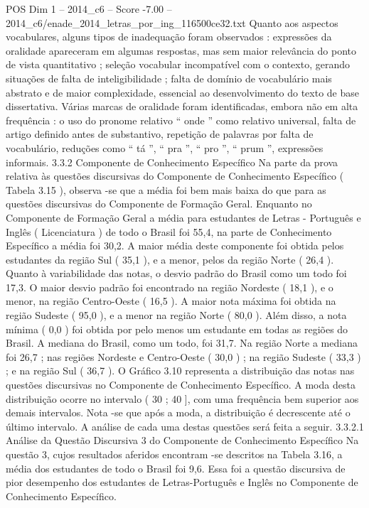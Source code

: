 \begin{textsample}{POS Dim 1 – 2014\_c6 – Score -7.00 – 2014\_c6/enade\_2014\_letras\_por\_ing\_116500ce32.txt}
Quanto aos aspectos vocabulares, alguns tipos de inadequação foram observados : expressões da oralidade apareceram em algumas respostas, mas sem maior relevância do ponto de vista quantitativo ; seleção vocabular incompatível com o contexto, gerando situações de falta de inteligibilidade ; falta de domínio de vocabulário mais abstrato e de maior complexidade, essencial ao desenvolvimento do texto de base dissertativa.
Várias marcas de oralidade foram identificadas, embora não em alta frequência : o uso do pronome relativo “ onde ” como relativo universal, falta de artigo definido antes de substantivo, repetição de palavras por falta de vocabulário, reduções como “ tá ”, “ pra ”, “ pro ”, “ prum ”, expressões informais. 3.3.2 Componente de Conhecimento Específico Na parte da prova relativa às questões discursivas do Componente de Conhecimento Específico ( Tabela 3.15 ), observa -se que a média foi bem mais baixa do que para as questões discursivas do Componente de Formação Geral.
Enquanto no Componente de Formação Geral a média para estudantes de Letras - Português e Inglês ( Licenciatura ) de todo o Brasil foi 55,4, na parte de Conhecimento Específico a média foi 30,2.
A maior média deste componente foi obtida pelos estudantes da região Sul ( 35,1 ), e a menor, pelos da região Norte ( 26,4 ).
Quanto à variabilidade das notas, o desvio padrão do Brasil como um todo foi 17,3.
O maior desvio padrão foi encontrado na região Nordeste ( 18,1 ), e o menor, na região Centro-Oeste ( 16,5 ).
A maior nota máxima foi obtida na região Sudeste ( 95,0 ), e a menor na região Norte ( 80,0 ).
Além disso, a nota mínima ( 0,0 ) foi obtida por pelo menos um estudante em todas as regiões do Brasil.
A mediana do Brasil, como um todo, foi 31,7.
Na região Norte a mediana foi 26,7 ; nas regiões Nordeste e Centro-Oeste ( 30,0 ) ; na região Sudeste ( 33,3 ) ; e na região Sul ( 36,7 ).
O Gráfico 3.10 representa a distribuição das notas nas questões discursivas no Componente de Conhecimento Específico.
A moda desta distribuição ocorre no intervalo ( 30 ; 40 ], com uma frequência bem superior aos demais intervalos.
Nota -se que após a moda, a distribuição é decrescente até o último intervalo.
A análise de cada uma destas questões será feita a seguir. 3.3.2.1 Análise da Questão Discursiva 3 do Componente de Conhecimento Específico Na questão 3, cujos resultados aferidos encontram -se descritos na Tabela 3.16, a média dos estudantes de todo o Brasil foi 9,6.
Essa foi a questão discursiva de pior desempenho dos estudantes de Letras-Português e Inglês no Componente de Conhecimento Específico.

\end{textsample}
